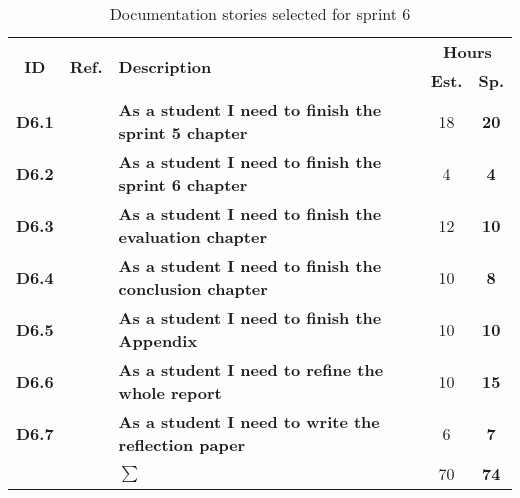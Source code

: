\begin{table*}[!ht]%
 \def\arraystretch{1.25}
 
 \caption{Documentation stories selected for sprint 6}
   \label{tab:sprint6Documentationstories}

\begin{tabularx}{\textwidth}{ccXcc} 

\toprule[0.5mm]
\multirow{2}{*}{\textbf{ID}} &
\multirow{2}{*}{\textbf{Ref.}} & \multirow{2}{*}{\textbf{Description}} & \multicolumn{2}{c}{\textbf{Hours}} \\
 					& & & \textbf{Est.} & \textbf{Sp.} \\
\midrule

\textbf{D6.1} 	& & {\bf As a student I need to finish the sprint 5 chapter} 		& 18  & \textbf{20} \\
	
\textbf{D6.2} 	& & {\bf As a student I need to finish the sprint 6 chapter} 		& 4	& \textbf{4} \\

\textbf{D6.3} 	& & {\bf As a student I need to finish the evaluation chapter} 		& 12	& \textbf{10} \\

\textbf{D6.4} 	&& {\bf As a student I need to finish the conclusion chapter} 		& 10	& \textbf{8} \\

\textbf{D6.5} 	&& {\bf As a student I need to finish the Appendix} 				& 10	& \textbf{10} \\

\textbf{D6.6} 	&& {\bf As a student I need to refine the whole report} 			& 10	& \textbf{15} \\
\textbf{D6.7} 	&& {\bf As a student I need to write the reflection paper} 			& 6	& \textbf{7} \\
\midrule
		
				&& \textbf{$\sum$}		&	70	& \textbf{74}
 \\																			
\bottomrule[0.5mm]
\end{tabularx}
\end{table*}
